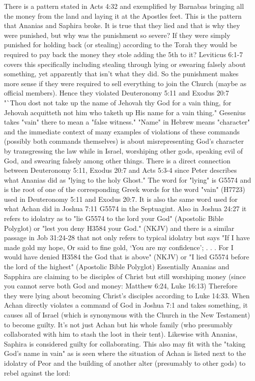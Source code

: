 \documentclass[11pt]{article}
\begin{document}
There is a pattern stated in Acts 4:32 and exemplified by Barnabas bringing all the money from the land and laying it at the Apostles feet. This is the pattern that Ananias and Saphira broke. It is true that they lied and that is why they were punished, but why was the punishment so severe? If they were simply punished for holding back (or stealing) according to the Torah they would be required to pay back the money they stole adding the 5th to it? Leviticus 6:1-7 covers this specifically including stealing through lying or swearing falsely about something, yet apparently that isn't what they did. So the punishment makes more sense if they were required to sell everything to join the Church (maybe as official members). Hence they violated Deuteronomy 5:11 and Exodus 20:7 "`Thou dost not take up the name of Jehovah thy God for a vain thing, for Jehovah acquitteth not him who taketh up His name for a vain thing."
Gesenius takes "vain" there to mean a "false witness." "Name" in Hebrew means "character" \cite{name means character} and the immediate context of many examples of violations of these commands (possibly both commands themselves) is about misrepresenting God's character by transgressing the law while in Israel, worshiping other gods, speaking evil of God, and swearing falsely among other things. There is a direct connection between Deuteronomy 5:11, Exodus 20:7 and Acts 5:3-4 since Peter describes what Ananias did as "lying to the holy Ghost." The word for "lying" is G5574 and is the root of one of the corresponding Greek words for the word "vain" (H7723) used in Deuteronomy 5:11 and Exodus 20:7. It is also the same word used for what Achan did in Joshua 7:11 G5574 in the Septuagint. Also in Joshua 24:27 it refers to idolatry as to "lie G5574 to the lord your God" (Apostolic Bible Polyglot) or "lest you deny H3584 your God." (NKJV) and there is a similar passage in Job 31:24-28 that not only refers to typical idolatry but says "If I have made gold my hope, Or said to fine gold, ‘You are my confidence’;  . . . For I would have denied H3584 the God that is above" (NKJV) or "I lied G5574 before the lord of the highest" (Apostolic Bible Polyglot) \cite{in vain} Essentially Ananias and Sapphira are claiming to be disciples of Christ but still worshiping money (since you cannot serve both God and money: Matthew 6:24, Luke 16:13) Therefore they were lying about becoming Christ's disciples according to Luke 14:33. When Achan directly violates a command of God in Joshua 7:1 and takes something, it causes all of Israel (which is synonymous with the Church in the New Testament) to become guilty. It's not just Achan but his whole family (who presumably collaborated with him to stash the loot in their tent). Likewise with Ananias, Saphira is considered guilty for collaborating. This also may fit with the "taking God's name in vain" as is seen where the situation of Achan is listed next to the idolatry of Peor and the building of another alter (presumably to other gods) to rebel  against the lord:
\end{document}
